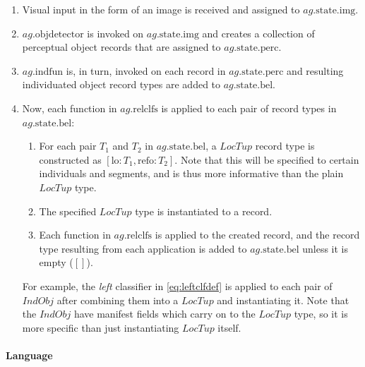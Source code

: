\begin{enumerate}
\item Visual input in the form of an image is received and assigned to $ag.\text{state}.\text{img}$.
\item $ag.\text{objdetector}$ is invoked on $ag.\text{state.img}$ and creates a collection of perceptual object records that are assigned to $ag.\text{state}.\text{perc}$.
\item $ag.\text{indfun}$ is, in turn, invoked on each record in $ag.\text{state.perc}$ and resulting individuated object record types are added to $ag.\text{state.bel}$.
\item Now, each function in $ag.\text{relclfs}$ is applied to each pair of record types in $ag.\text{state.bel}$:
	\begin{enumerate}
    \item For each pair $T_1$ and $T_2$ in $ag.\text{state.bel}$, a $LocTup$ record type is constructed as $[\text{lo}: T_1, \text{refo}: T_2]$. Note that this will be specified to certain individuals and segments, and is thus more informative than the plain $LocTup$ type.
    \item The specified $LocTup$ type is instantiated to a record.
	\item Each function in $ag.\text{relclfs}$ is applied to the created record, and the record type resulting from each application is added to $ag.\text{state.bel}$ unless it is empty ($[]$).
	\end{enumerate}
	For example, the \textit{left} classifier in \autoref{eq:leftclfdef} is applied to each pair of $IndObj$ after combining them into a $LocTup$ and instantiating it.
    Note that the $IndObj$ have manifest fields which carry on to the $LocTup$ type, so it is more specific than just instantiating $LocTup$ itself.
\end{enumerate}



\paragraph{Language}

